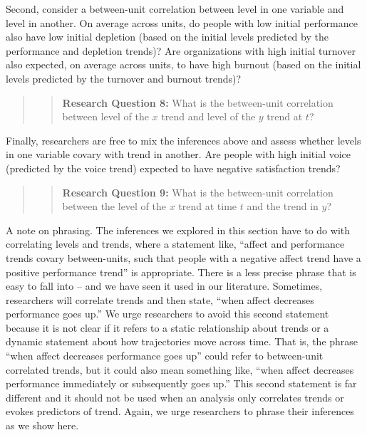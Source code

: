 \documentclass[english,,man]{apa6}
\theoremstyle{definition}
\theoremstyle{definition}
\theoremstyle{definition}
\theoremstyle{remark}
\begin{document}
Second, consider a between-unit correlation between level in one
variable and level in another. On average across units, do people with
low initial performance also have low initial depletion (based on the
initial levels predicted by the performance and depletion trends)? Are
organizations with high initial turnover also expected, on average
across units, to have high burnout (based on the initial levels
predicted by the turnover and burnout trends)?

\begin{quote}
\begin{quote}
\textbf{Research Question 8:} What is the between-unit correlation
between level of the \(x\) trend and level of the \(y\) trend at \(t\)?
\end{quote}
\end{quote}

Finally, researchers are free to mix the inferences above and assess
whether levels in one variable covary with trend in another. Are people
with high initial voice (predicted by the voice trend) expected to have
negative satisfaction trends?

\begin{quote}
\begin{quote}
\textbf{Research Question 9:} What is the between-unit correlation
between the level of the \(x\) trend at time \(t\) and the trend in
\(y\)?
\end{quote}
\end{quote}

A note on phrasing. The inferences we explored in this section have to
do with correlating levels and trends, where a statement like,
\enquote{affect and performance trends covary between-units, such that
people with a negative affect trend have a positive performance trend}
is appropriate. There is a less precise phrase that is easy to fall into
-- and we have seen it used in our literature. Sometimes, researchers
will correlate trends and then state, \enquote{when affect decreases
performance goes up.} We urge researchers to avoid this second statement
because it is not clear if it refers to a static relationship about
trends or a dynamic statement about how trajectories move across time.
That is, the phrase \enquote{when affect decreases performance goes up}
could refer to between-unit correlated trends, but it could also mean
something like, \enquote{when affect decreases performance immediately
or subsequently goes up.} This second statement is far different and it
should not be used when an analysis only correlates trends or evokes
predictors of trend. Again, we urge researchers to phrase their
inferences as we show here.
\end{document}
